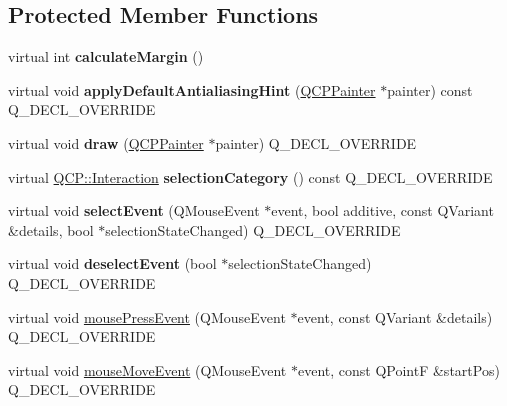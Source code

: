 \subsection*{Protected Member Functions}
\begin{DoxyCompactItemize}
\item 
\mbox{\label{classQCPAxis_a47bdb0a55de6759489ee47665199aebb}} 
virtual int {\bfseries calculate\+Margin} ()
\item 
\mbox{\label{classQCPAxis_adbaeffcdc2707f2bd5dc1bbd11236770}} 
virtual void {\bfseries apply\+Default\+Antialiasing\+Hint} (\hyperlink{classQCPPainter}{Q\+C\+P\+Painter} $\ast$painter) const Q\+\_\+\+D\+E\+C\+L\+\_\+\+O\+V\+E\+R\+R\+I\+DE
\item 
\mbox{\label{classQCPAxis_ac15ebb4225ca5212d8e5fffae481bc9b}} 
virtual void {\bfseries draw} (\hyperlink{classQCPPainter}{Q\+C\+P\+Painter} $\ast$painter) Q\+\_\+\+D\+E\+C\+L\+\_\+\+O\+V\+E\+R\+R\+I\+DE
\item 
\mbox{\label{classQCPAxis_ab751e3e96495716a2f6742ca7d7b3d49}} 
virtual \hyperlink{namespaceQCP_a2ad6bb6281c7c2d593d4277b44c2b037}{Q\+C\+P\+::\+Interaction} {\bfseries selection\+Category} () const Q\+\_\+\+D\+E\+C\+L\+\_\+\+O\+V\+E\+R\+R\+I\+DE
\item 
\mbox{\label{classQCPAxis_a50c3ed18e189d48421ec2978f88e4f87}} 
virtual void {\bfseries select\+Event} (Q\+Mouse\+Event $\ast$event, bool additive, const Q\+Variant \&details, bool $\ast$selection\+State\+Changed) Q\+\_\+\+D\+E\+C\+L\+\_\+\+O\+V\+E\+R\+R\+I\+DE
\item 
\mbox{\label{classQCPAxis_a5bc1f8a8d0fbc7658eba70c80279ed31}} 
virtual void {\bfseries deselect\+Event} (bool $\ast$selection\+State\+Changed) Q\+\_\+\+D\+E\+C\+L\+\_\+\+O\+V\+E\+R\+R\+I\+DE
\item 
virtual void \hyperlink{classQCPAxis_a61bc07cda6193a3fa6b5aa198fc4e4fa}{mouse\+Press\+Event} (Q\+Mouse\+Event $\ast$event, const Q\+Variant \&details) Q\+\_\+\+D\+E\+C\+L\+\_\+\+O\+V\+E\+R\+R\+I\+DE
\item 
virtual void \hyperlink{classQCPAxis_ac5a269609e6177737faabdc46434d8c7}{mouse\+Move\+Event} (Q\+Mouse\+Event $\ast$event, const Q\+PointF \&start\+Pos) Q\+\_\+\+D\+E\+C\+L\+\_\+\+O\+V\+E\+R\+R\+I\+DE

\end{DoxyCompactItemize}
